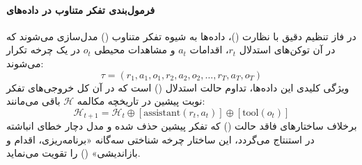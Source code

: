 \paragraph*{فرمول‌بندی تفکر متناوب در داده‌های }
در فاز تنظیم دقیق با نظارت ()، داده‌ها به شیوه تفکر متناوب () مدل‌سازی می‌شوند که در آن توکن‌های استدلال $r_t$، اقدامات $a_t$ و مشاهدات محیطی $o_t$ در یک چرخه تکرار می‌شوند:
\begin{equation}
    \tau = (r_1, a_1, o_1, r_2, a_2, o_2, \dots, r_T, a_T, o_T)
\end{equation}
ویژگی کلیدی این داده‌ها، تداوم حالت استدلال () است که در آن کل خروجی‌های تفکر نوبت پیشین در تاریخچه مکالمه $\mathcal{H}$ باقی می‌مانند:
\begin{equation}
    \mathcal{H}_{t+1} = \mathcal{H}_t \oplus [\text{assistant}(r_t, a_t)] \oplus [\text{tool}(o_t)]
\end{equation}
برخلاف ساختارهای فاقد حالت () که تفکر پیشین حذف شده و مدل دچار خطای انباشته در استنتاج می‌گردد، این ساختار چرخه شناختی سه‌گانه «برنامه‌ریزی، اقدام و بازاندیشی» () را تقویت می‌نماید.

